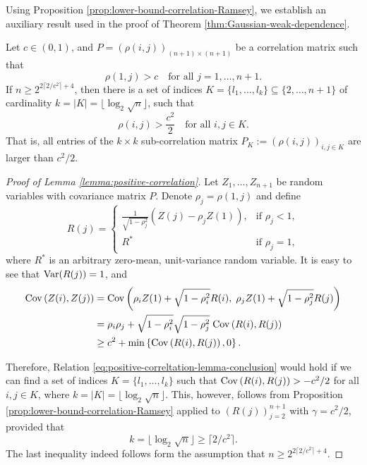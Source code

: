 Using Proposition \ref{prop:lower-bound-correlation-Ramsey}, we establish an auxiliary result used in the proof of Theorem \ref{thm:Gaussian-weak-dependence}.


\begin{lemma} \label{lemma:positive-correlation}
  Let $c\in(0,1)$, and $P = \left(\rho(i,j)\right)_{(n+1)\times(n+1)}$ be a correlation matrix such that \begin{equation} \label{eq:positive-correlation-lemma-condition}
      \rho(1,j) > c \quad \mbox{for all } j = 1,\ldots,n+1.
  \end{equation}
  If $n \ge 2^{2\lceil2/c^2\rceil+4}$, then there is a set of indices $K = \{l_1, \ldots, l_k\}\subseteq \{2,\ldots,n+1\}$ of cardinality $k = |K| = \lfloor\log_2{\sqrt{n}}\rfloor$, such that 
  \begin{equation} \label{eq:positive-correltation-lemma-conclusion}
      \rho(i,j) > \frac{c^2}{2} \quad\mbox{for all } i,j\in K.
  \end{equation}
  That is, all entries of the $k\times k$ sub-correlation matrix $P_K:=\left(\rho(i,j)\right)_{i,j\in K}$ are larger than $c^2/2$.
\end{lemma}

\begin{proof}[Proof of Lemma \ref{lemma:positive-correlation}]
    Let $Z_1, \ldots, Z_{n+1}$ be random variables with covariance matrix $P$.
    Denote $\rho_j = \rho(1,j)$ and define 
    \begin{equation}
      R(j) = 
      \begin{cases}
        \frac{1}{\sqrt{1-\rho_j^2}}\left(Z(j) - \rho_j Z(1)\right), &\mbox{if } \rho_j<1,\\
        R^* &\mbox{if } \rho_j=1,
      \end{cases}
    \end{equation}
    where $R^*$ is an arbitrary zero-mean, unit-variance random variable.
    It is easy to see that ${\rm {Var}}(R(j)) = 1$, and
    \begin{align*}
    \cov\left(Z(i), Z(j)\right) &= \cov\left(\rho_i Z(1) + \sqrt{1-\rho_i^2} R(i), \; \rho_j Z(1) + \sqrt{1-\rho_j^2} R(j)\right) \\
        &= \rho_i\rho_j + \sqrt{1-\rho_i^2}\sqrt{1-\rho_j^2} \;\cov\left(R(i), R(j)\right) \\
        &\ge c^2 + \min\left\{\cov\left(R(i), R(j)\right), 0\right\}.
    \end{align*}
    
    Therefore, Relation \eqref{eq:positive-correltation-lemma-conclusion} would hold if we can find a set of indices $K = \{l_1,\ldots,l_k\}$ such that ${\rm {Cov}}\left(R(i),R(j)\right)>-c^2/2$ for all $i,j\in K$, where $k=|K|=\lfloor\log_2\sqrt{n}\rfloor$.
    This, however, follows from Proposition \ref{prop:lower-bound-correlation-Ramsey} applied to $\left(R(j)\right)_{j=2}^{n+1}$ with $\gamma = c^2/2$, provided that 
    $$
    k = \lfloor\log_2\sqrt{n}\rfloor \ge \lceil 2/c^2 \rceil.
    $$
    The last inequality indeed follows form the assumption that $n \ge 2^{2\lceil2/c^2\rceil+4}$.
\end{proof}


